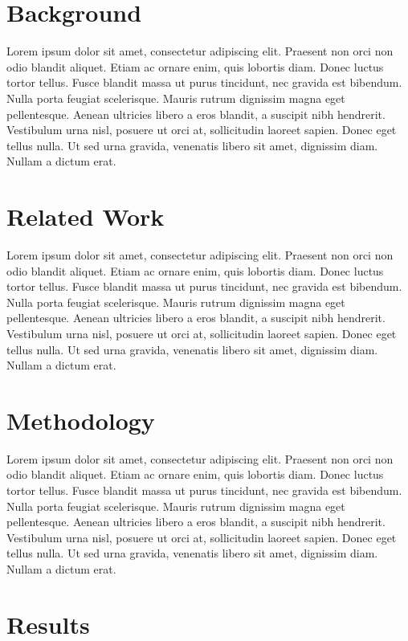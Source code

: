 \documentclass[conference]{IEEEtran}
\begin{document}
\section{Background}

Lorem ipsum dolor sit amet, consectetur adipiscing elit. Praesent non orci non odio blandit aliquet. Etiam ac ornare enim, quis lobortis diam. Donec luctus tortor tellus. Fusce blandit massa ut purus tincidunt, nec gravida est bibendum. Nulla porta feugiat scelerisque. Mauris rutrum dignissim magna eget pellentesque. Aenean ultricies libero a eros blandit, a suscipit nibh hendrerit. Vestibulum urna nisl, posuere ut orci at, sollicitudin laoreet sapien. Donec eget tellus nulla. Ut sed urna gravida, venenatis libero sit amet, dignissim diam. Nullam a dictum erat.

\section{Related Work}

Lorem ipsum dolor sit amet, consectetur adipiscing elit. Praesent non orci non odio blandit aliquet. Etiam ac ornare enim, quis lobortis diam. Donec luctus tortor tellus. Fusce blandit massa ut purus tincidunt, nec gravida est bibendum. Nulla porta feugiat scelerisque. Mauris rutrum dignissim magna eget pellentesque. Aenean ultricies libero a eros blandit, a suscipit nibh hendrerit. Vestibulum urna nisl, posuere ut orci at, sollicitudin laoreet sapien. Donec eget tellus nulla. Ut sed urna gravida, venenatis libero sit amet, dignissim diam. Nullam a dictum erat.

\section{Methodology}

Lorem ipsum dolor sit amet, consectetur adipiscing elit. Praesent non orci non odio blandit aliquet. Etiam ac ornare enim, quis lobortis diam. Donec luctus tortor tellus. Fusce blandit massa ut purus tincidunt, nec gravida est bibendum. Nulla porta feugiat scelerisque. Mauris rutrum dignissim magna eget pellentesque. Aenean ultricies libero a eros blandit, a suscipit nibh hendrerit. Vestibulum urna nisl, posuere ut orci at, sollicitudin laoreet sapien. Donec eget tellus nulla. Ut sed urna gravida, venenatis libero sit amet, dignissim diam. Nullam a dictum erat.

\section{Results}
\end{document}
